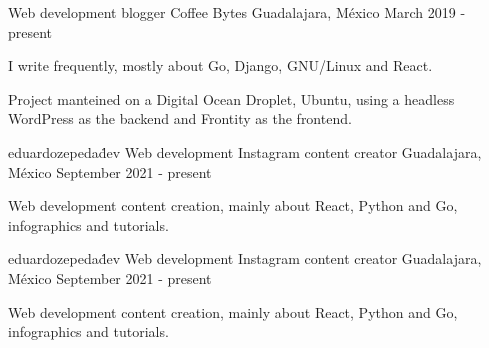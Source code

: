 \begin{cventries}
  \cventry
    {Web development blogger}
    {Coffee Bytes}
    {Guadalajara, México}
    {March 2019 - present}
    {
      \begin{cvitems}
        \item {I write frequently, mostly about Go, Django, GNU/Linux and React.}
        \item {Project manteined on a Digital Ocean Droplet, Ubuntu, using a headless WordPress as the backend and Frontity as the frontend.}
      \end{cvitems}
    }
  \cventry
    {eduardozepeda\.dev}
    {Web development Instagram content creator}
    {Guadalajara, México}
    {September 2021 - present}
    {
      \begin{cvitems}
        \item {Web development content creation, mainly about React, Python and Go, infographics and tutorials. }
      \end{cvitems}
    }

    \cventry
    {eduardozepeda\.dev}
    {Web development Instagram content creator}
    {Guadalajara, México}
    {September 2021 - present}
    {
      \begin{cvitems}
        \item {Web development content creation, mainly about React, Python and Go, infographics and tutorials. }
      \end{cvitems}
    }


\end{cventries}

